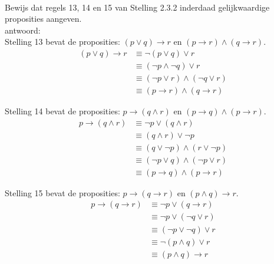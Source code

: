 \begin{answer}\mbox{}\\ %
Bewijs dat regels 13, 14 en 15 van Stelling 2.3.2 inderdaad gelijkwaardige proposities aangeven. \\
antwoord: \\
Stelling 13 bevat de proposities: $(p\lor q)\rightarrow r$ en $(p\rightarrow r)\land(q\rightarrow r)$. 
\begin{align}
(p\vee q)\rightarrow r &\equiv \neg(p\vee q)\vee r  \tag{St-2.3.2: 7}\\
&\equiv (\neg p\wedge\neg q)\vee r \tag{St-2.3.2: 9}\\
&\equiv (\neg p\vee r)\wedge(\neg q\vee r) \tag{St-2.3.2:12}\\
&\equiv (p\rightarrow r)\wedge(q\rightarrow r) \tag{St-2.3.2: 7}
\end{align}

\noindent
Stelling 14 bevat de proposities: $p\rightarrow(q\wedge r)$ en $(p\rightarrow q)\wedge(p\rightarrow r)$.
\begin{align}
p\rightarrow(q\wedge r) &\equiv \neg p\vee(q\wedge r) \tag{St-2.3.2:7}\\
&\equiv (q \land r) \lor \neg p \tag{St-2.3.2:2}\\
&\equiv (q \lor \neg p) \land (r \lor \neg p) \tag{St-2.3.2:12}\\
&\equiv (\neg p \lor q)\wedge (\neg p \lor r) \tag{tweemaal St-2.3.2:2}\\
&\equiv (p\rightarrow q)\wedge (p\rightarrow r) \tag{tweemaal St-2.3.2:7}
\end{align}

\noindent
Stelling 15 bevat de proposities: $p\rightarrow (q\rightarrow r)$ en $(p \land q) \to r$.
\begin{align}
p\rightarrow (q\rightarrow r) &\equiv \neg p\vee (q\rightarrow r) \tag{St-2.3.2: 7}\\
&\equiv \neg p\vee(\neg q\vee r) \tag{St-2.3.2: 7}\\
&\equiv (\neg p\vee\neg q)\vee r \tag{St-2.3.2: 5}\\
&\equiv \neg(p\wedge q)\vee r \tag{St-2.3.2:10}\\
&\equiv (p\wedge q)\rightarrow r \tag{St-2.3.2: 7}
\end{align}
\end{answer}

